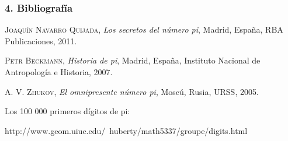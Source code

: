 \documentclass{beamer}
\begin{document}

\begin{frame}
  \frametitle{4. Bibliografía}

  \begin{thebibliography}{10}

    \beamertemplatebookbibitems
       \textsc{Joaquín Navarro Quijada}, \textit{Los secretos del número pi}, 
        Madrid, España, RBA Publicaciones, 2011. 

    \beamertemplatebookbibitems
       \textsc{Petr Beckmann}, \textit{Historia de pi}, Madrid, España,
        Instituto Nacional de Antropología e Historia, 2007.

    \beamertemplatebookbibitems
       \textsc{A. V. Zhukov}, \textit{El omnipresente número pi}, Moscú, Rusia,
        URSS, 2005.

    \beamertemplatebookbibitems
       Los 100 000 primeros dígitos de pi: 
       \begin{center}
          http://www.geom.uiuc.edu/~huberty/math5337/groupe/digits.html
       \end{center}

  \end{thebibliography}
\end{frame}

\end{document}

